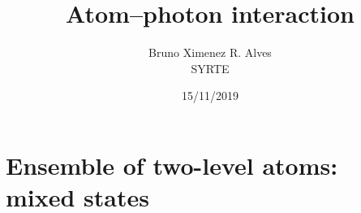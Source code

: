 \documentclass[letterpaper, 12pt]{article}
\title{Atom--photon interaction}
\author{
Bruno Ximenez R. Alves \\
SYRTE\\
}
\date{15/11/2019}
\begin{document}
\maketitle
\tableofcontents


\section{Ensemble of two-level atoms: mixed states}
\end{document}
